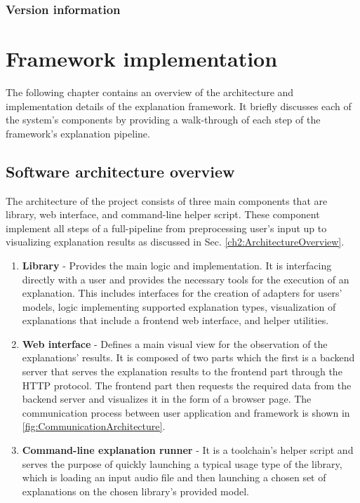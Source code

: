 \documentclass[
    bindingoffset=5mm,  %
    footnoteindent=3mm, %
    hyphenation=true    %
]{src/wut-thesis}
\begin{document}
\subsubsection{Version information}

%
%
\clearpage %
\section{Framework implementation} \label{ch:implementation}

    The following chapter contains an overview of the architecture and implementation details of the explanation framework. It briefly discusses each of the system's components by providing
    a walk-through of each step of the framework's explanation pipeline.

\subsection{Software architecture overview}

    The architecture of the project consists of three main components that are library, web interface, and command-line helper script.
    These component implement all steps of a full-pipeline from preprocessing
    user's input up to visualizing explanation results as discussed in Sec. \ref{ch2:ArchitectureOverview}.

\begin{enumerate}
    \item \textbf{Library} - Provides the main logic and implementation. It is interfacing directly with a user and
    provides the necessary tools for the execution of an explanation. This includes interfaces for the creation of 
    adapters for users' models, logic implementing supported explanation types, visualization of explanations that 
    include a frontend web interface, and helper utilities.

    \item \textbf{Web interface} - Defines a main visual view for the observation of the explanations' results. It is
    composed of two parts which the first is a backend server that serves the explanation results to the frontend part
    through the HTTP protocol. The frontend part then requests the required data from the backend server and visualizes
    it in the form of a browser page. The communication process between user application and framework is shown in
    \ref{fig:CommunicationArchitecture}.

    \item \textbf{Command-line explanation runner} - It is a toolchain's helper script and serves the purpose of quickly 
    launching a typical usage type of the library, which is loading an input audio file and then launching a chosen set 
    of explanations on the chosen library's provided model.
\end{enumerate}
\end{document}
